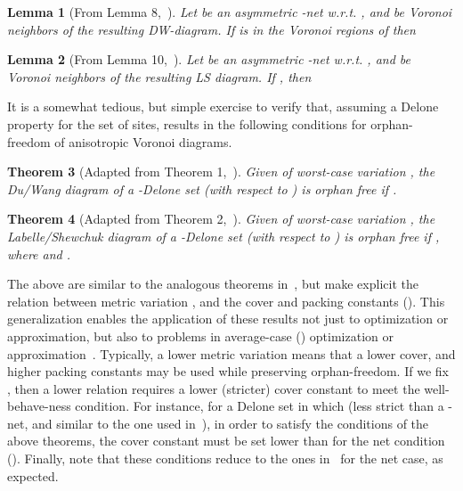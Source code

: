 \documentclass[11pt]{article}
\newtheorem{theorem}{Theorem}[section]
\newtheorem{lemma}[theorem]{Lemma}
\begin{document}
\begin{lemma}[From Lemma 8,~\cite{avd}] 
	Let  be an asymmetric -net w.r.t. , and  be Voronoi neighbors of the resulting DW-diagram. 
	If  is in the Voronoi regions of  then
		
\end{lemma}

\begin{lemma}[From Lemma 10,~\cite{avd}]
	Let  be an asymmetric -net w.r.t. , and  be Voronoi neighbors of the resulting LS diagram. 
	If , then 
		
\end{lemma}


It is a somewhat tedious, but simple exercise to verify that, assuming a Delone property for the set of sites, results in the following conditions for orphan-freedom of anisotropic Voronoi diagrams. 

\begin{theorem}[Adapted from Theorem 1,~\cite{avd}]\label{th1}
Given  of worst-case variation , 
	the Du/Wang diagram of a -Delone set (with respect to ) is orphan free if 
	.
\end{theorem}


\begin{theorem}[Adapted from Theorem 2,~\cite{avd}]\label{th2}
Given  of worst-case variation , 
	the Labelle/Shewchuk diagram of a -Delone set (with respect to ) is orphan free if 
	, where  and . 
\end{theorem}

The above are similar to the analogous theorems in~\cite{avd}, but make explicit the relation between metric variation , and the cover and packing constants (). 
This generalization enables the application of these results not just to  optimization or approximation, 
	but also to problems in average-case () optimization or approximation~\cite{OQ,GruberOQ}. 
Typically, a lower metric variation means that a lower cover, and higher packing constants may be used while preserving orphan-freedom. 
If we fix , then a lower relation  requires a lower (stricter) cover constant to meet the well-behave-ness condition. 
For instance, for a Delone set in which  (less strict than a -net, and similar to the one used in~\cite{GruberOQ}), in order to satisfy the conditions of the above theorems, 
	the cover constant must be set lower than for the net condition (). 	
Finally, note that these conditions reduce to the ones in~\cite{avd} for the net case, as expected. 
\end{document}
